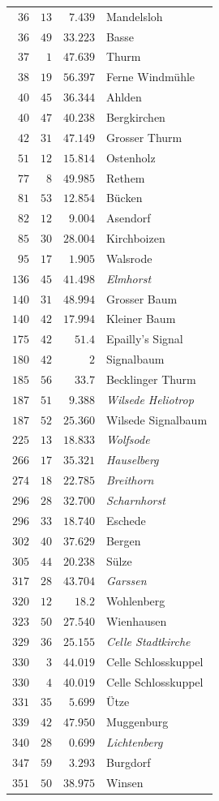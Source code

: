 \begin{longtable}{@{}rrrp{.61\linewidth}@{}}
\(36\)&\(13\)&\(7.439\)&\raggedright Mandelsloh\tabularnewline
\(36\)&\(49\)&\(33.223\)&\raggedright Basse\tabularnewline
\(37\)&\(1\)&\(47.639\)&\raggedright Thurm\tabularnewline
\(38\)&\(19\)&\(56.397\)&\raggedright Ferne Windmühle\tabularnewline
\(40\)&\(45\)&\(36.344\)&\raggedright Ahlden\tabularnewline
\(40\)&\(47\)&\(40.238\)&\raggedright Bergkirchen\tabularnewline
\(42\)&\(31\)&\(47.149\)&\raggedright Grosser Thurm\tabularnewline
\(51\)&\(12\)&\(15.814\)&\raggedright Ostenholz\tabularnewline
\(77\)&\(8\)&\(49.985\)&\raggedright Rethem\tabularnewline
\(81\)&\(53\)&\(12.854\)&\raggedright Bücken\tabularnewline
\(82\)&\(12\)&\(9.004\)&\raggedright Asendorf\tabularnewline
\(85\)&\(30\)&\(28.004\)&\raggedright Kirchboizen\tabularnewline
\(95\)&\(17\)&\(1.905\)&\raggedright Walsrode\tabularnewline
\(136\)&\(45\)&\(41.498\)&\raggedright \textit{Elmhorst}\tabularnewline
\(140\)&\(31\)&\(48.994\)&\raggedright Grosser Baum\tabularnewline
\(140\)&\(42\)&\(17.994\)&\raggedright Kleiner Baum\tabularnewline
\(175\)&\(42\)&\(51.4\)&\raggedright Epailly’s Signal\tabularnewline
\(180\)&\(42\)&\(2\)&\raggedright Signalbaum\tabularnewline
\(185\)&\(56\)&\(33.7\)&\raggedright Becklinger Thurm\tabularnewline
\(187\)&\(51\)&\(9.388\)&\raggedright \textit{Wilsede Heliotrop}\tabularnewline
\(187\)&\(52\)&\(25.360\)&\raggedright Wilsede Signalbaum\tabularnewline
\(225\)&\(13\)&\(18.833\)&\raggedright \textit{Wolfsode}\tabularnewline
\(266\)&\(17\)&\(35.321\)&\raggedright \textit{Hauselberg}\tabularnewline
\(274\)&\(18\)&\(22.785\)&\raggedright \textit{Breithorn}\tabularnewline
\(296\)&\(28\)&\(32.700\)&\raggedright \textit{Scharnhorst}\tabularnewline
\(296\)&\(33\)&\(18.740\)&\raggedright Eschede\tabularnewline
\(302\)&\(40\)&\(37.629\)&\raggedright Bergen\tabularnewline
\(305\)&\(44\)&\(20.238\)&\raggedright Sülze\tabularnewline
\(317\)&\(28\)&\(43.704\)&\raggedright \textit{Garssen}\tabularnewline
\(320\)&\(12\)&\(18.2\)&\raggedright Wohlenberg\tabularnewline
\(323\)&\(50\)&\(27.540\)&\raggedright Wienhausen\tabularnewline
\(329\)&\(36\)&\(25.155\)&\raggedright \textit{Celle Stadtkirche}\tabularnewline
\(330\)&\(3\)&\(44.019\)&\raggedright Celle Schlosskuppel\tabularnewline
\(330\)&\(4\)&\(40.019\)&\raggedright Celle Schlosskuppel\tabularnewline
\(331\)&\(35\)&\(5.699\)&\raggedright Ütze\tabularnewline
\(339\)&\(42\)&\(47.950\)&\raggedright Muggenburg\tabularnewline
\(340\)&\(28\)&\(0.699\)&\raggedright \textit{Lichtenberg}\tabularnewline
\(347\)&\(59\)&\(3.293\)&\raggedright Burgdorf\tabularnewline
\(351\)&\(50\)&\(38.975\)&\raggedright Winsen\tabularnewline
\end{longtable}
\endgroup
